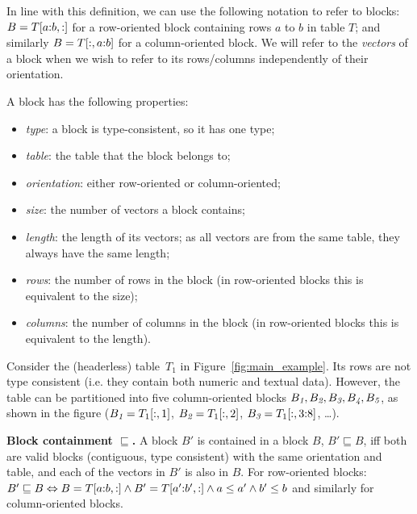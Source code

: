 In line with this definition, we can use the following notation to refer to blocks: $B = T[a{:}b,:]$ for a row-oriented block containing rows $a$ to $b$ in table $T$; and similarly $B = T[{:},a{:}b]$ for a column-oriented block.
We will refer to the \textit{vectors} of a block when we wish to refer to its rows/columns independently of their orientation.


A block has the following properties:
\begin{itemize}
\item \textit{type}: a block is type-consistent, so it has one type;
\item \textit{table}: the table that the block belongs to;
\item \textit{orientation}: either row-oriented or column-oriented;
\item \textit{size}: the number of vectors a block contains;
\item \textit{length}: the length of its vectors; as all vectors are from the same table, they always have the same length;
\item \textit{rows}: the number of rows in the block
(in row-oriented blocks this is equivalent to the size);
\item \textit{columns}: the number of columns in the block (in row-oriented blocks this is equivalent to the length).
\end{itemize}



\begin{example}
Consider the (headerless) table~$T_1$ in Figure~\ref{fig:main_example}.
Its rows are not type consistent (i.e. they contain both numeric and textual data).
However, the table can be partitioned into five column-oriented blocks $B_{\textit{1}}, B_{\textit{2}}, B_{\textit{3}}, B_{\textit{4}}, B_{\textit{5}}$, as shown in the figure ($B_{\textit{1}} = T_1[:,1]$, $B_{\textit{2}} = T_1[:,2]$, $B_{\textit{3}} = T_1[:,3{:}8]$, \dots).
\end{example}

\begin{definition}
\textbf{Block containment $\sqsubseteq$.} 
A block $B'$ is contained in a block $B$, $B' \sqsubseteq B$, iff both are valid blocks (contiguous, type consistent) with the same orientation and table, and each of the vectors in $B'$ is also in $B$. For row-oriented blocks: $B' \sqsubseteq B \Leftrightarrow B=T[a{:}b,:] \wedge B'=T[a'{:}b',:] \wedge a \leq a' \wedge b' \leq b$ and similarly for column-oriented blocks.
\end{definition}


